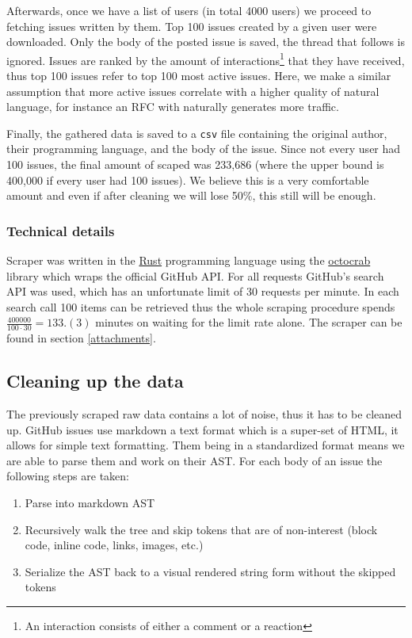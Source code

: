 \documentclass[]{article}
\newcommand{\code}[1]{\texttt{#1}}
\begin{document}
Afterwards, once we have a list of users (in total 4000 users) we proceed to fetching issues written by them. Top 100 issues created by a given user were downloaded. Only the body of the posted issue is saved, the thread that follows is ignored. Issues are ranked by the amount of interactions\footnote{An interaction consists of either a comment or a reaction} that they have received, thus top 100 issues refer to top 100 most active issues. Here, we make a similar assumption that more active issues correlate with a higher quality of natural language, for instance an RFC with naturally generates more traffic.

Finally, the gathered data is saved to a \code{csv} file containing the original author, their programming language, and the body of the issue. Since not every user had 100 issues, the final amount of scaped was 233,686 (where the upper bound is 400,000 if every user had 100 issues). We believe this is a very comfortable amount and even if after cleaning we will lose 50\%, this still will be enough.

\subsubsection{Technical details}

Scraper was written in the \href{https://www.rust-lang.org/}{Rust} programming language using the \href{https://github.com/XAMPPRocky/octocrab}{octocrab} library which wraps the official GitHub API. For all requests GitHub's search API was used, which has an unfortunate limit of 30 requests per minute. In each search call 100 items can be retrieved thus the whole scraping procedure spends $\frac{400000}{100 \cdot 30} = 133.(3)$ minutes on waiting for the limit rate alone. The scraper can be found in section \ref{attachments}.

\subsection{Cleaning up the data}

The previously scraped raw data contains a lot of noise, thus it has to be cleaned up. GitHub issues use markdown a text format which is a super-set of HTML, it allows for simple text formatting. Them being in a standardized format means we are able to parse them and work on their AST. For each body of an issue the following steps are taken:

\begin{enumerate}
    \item Parse into markdown AST
    \item Recursively walk the tree and skip tokens that are of non-interest (block code, inline code, links, images, etc.)
    \item Serialize the AST back to a visual rendered string form without the skipped tokens
\end{enumerate}
\end{document}
